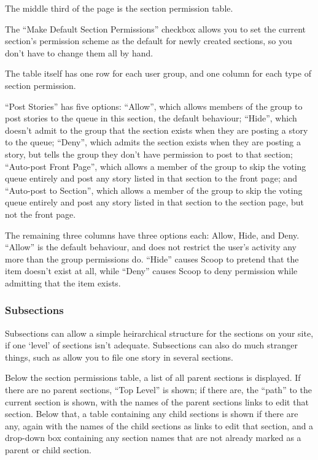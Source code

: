 The middle third of the page is the section permission table.

The ``Make Default Section Permissions'' checkbox allows you to set the current section's permission scheme as the default for newly created sections, so you don't have to change them all by hand.

The table itself has one row for each user group, and one column for each type of section permission.

``Post Stories'' has five options: ``Allow'', which allows members of the group to post stories to the queue in this section, the default behaviour; ``Hide'', which doesn't admit to the group that the section exists when they are posting a story to the queue; ``Deny'', which admits the section exists when they are posting a story, but tells the group they don't have permission to post to that section; ``Auto-post Front Page'', which allows a member of the group to skip the voting queue entirely and post any story listed in that section to the front page; and ``Auto-post to Section'', which allows a member of the group to skip the voting queue entirely and post any story listed in that section to the section page, but not the front page.

The remaining three columns have three options each: Allow, Hide, and Deny.  ``Allow'' is the default behaviour, and does not restrict the user's activity any more than the group permissions do.  ``Hide'' causes Scoop to pretend that the item doesn't exist at all, while ``Deny'' causes Scoop to deny permission while admitting that the item exists.

\subsubsection{Subsections}
\label{admin-tools-subsections}

Subsections can allow a simple heirarchical structure for the sections on your site, if one `level' of sections isn't adequate. Subsections can also do much stranger things, such as allow you to file one story in several sections.

Below the section permissions table, a list of all parent sections is displayed. If there are no parent sections, ``Top Level'' is shown; if there are, the ``path'' to the current section is shown, with the names of the parent sections links to edit that section. Below that, a table containing any child sections is shown if there are any, again with the names of the child sections as links to edit that section, and a drop-down box containing any section names that are not already marked as a parent or child section.

